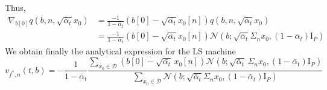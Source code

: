 \documentclass[a4paper,10pt]{article}
\theoremstyle{definition} %
\theoremstyle{definition} %
\theoremstyle{definition} %
\theoremstyle{definition} %
\newcommand{\R}{\mathbb{R}}
\newcommand{\E}[1]{\mathbb{E} \left[ {#1} \right] }
\newcommand{\Normal}[1]{\mathcal{N}\left( {#1} \right)}
\renewcommand{\ker}[1]{\mathrm{ker}\left( {#1} \right)}
\newcommand{\Id}{\mathrm{I}}
\newcommand{\norm}[1]{\left\| #1 \right \|}
\newcommand{\0}{\boldsymbol{0}}
\renewcommand{\Im}[1]{\mathrm{Im} \left( {#1}  \right)}
\begin{document}
Thus,
\begin{align*}
    \nabla_{b[0]}q(b, n, \sqrt{\bar\alpha_t}x_0) &= \frac{-1}{1-\bar\alpha_t} \left(b[0] -  \sqrt{\bar{\alpha_t}}x_0[n]\right) q(b, n, \sqrt{\bar\alpha_t}x_0)\\
    &= \frac{-1}{1-\bar\alpha_t} \left(b[0] -  \sqrt{\bar{\alpha_t}}x_0[n]\right) \Normal{b; \sqrt{\bar \alpha_t} \Sigma_n x_0, (1-\bar\alpha_t) \Id_P}
\end{align*}
We obtain finally the analytical expression for the LS machine
\begin{equation}
    v_{f^*,n}(t,b) = -\frac{1}{1-\bar\alpha_t} \frac{\sum_{x_0\in\mathcal{D}}\left(b[0] -  \sqrt{\bar{\alpha_t}}\,x_0[n]\right) \Normal{b; \sqrt{\bar \alpha_t} \,\Sigma_n x_0, (1-\bar\alpha_t) \Id_P}}{\sum_{x_0 \in \mathcal{D}} \Normal{b; \sqrt{\bar \alpha_t} \Sigma_n x_0, (1-\bar\alpha_t) \Id_P}}
\end{equation}
\end{document}
